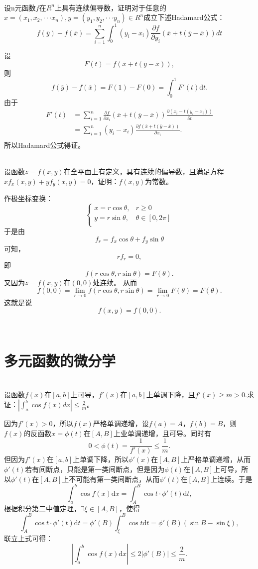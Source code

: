 	\begin{exercise}
	\hfill\\
  设n元函数$f$在$R^n$上具有连续偏导数，证明对于任意的$x=(x_1,x_2,\cdot\cdot\cdot x_n),y=(y_1,y_2,\cdot\cdot\cdot y_n)\in R^n$成立下述Hadamard公式：
  $$\displaystyle f(\bar{y})-f(\bar{x})=\sum_{i=1}^n\int_0^1(y_i-x_i)\frac{\partial f}{\partial y_i}(\bar{x}+t(\bar{y}-\bar{x}))dt$$
	
设$$F(t)=f(\overline{x}+t(\overline{y}-\overline{x})),$$
则$$f(\overline{y})-f(\overline{x})=F(1)-F(0)=\int_0^1F'(t)\mathrm{d}t.$$
由于
\begin{align*}
F'(t)&=\sum_{i=1}^n\frac{\partial f}{\partial x_i}(\overline{x}+t(\overline{y}-\overline{x}))\frac{\partial(x_i-t(y_i-x_i))}{\partial t}\\
&=\sum_{i=1}^n(y_i-x_i)\frac{\partial f(\overline{x}+t(\overline{y}-\overline{x}))}{\partial x_i}.\\
\end{align*}
所以Hadamard公式得证。
	\end{exercise}
	\begin{exercise}
	\hfill\\
	  设函数$z=f(x,y)$在全平面上有定义，具有连续的偏导数，且满足方程$xf_x(x,y)+yf_y(x,y)=0$，证明：$f(x,y)$为常数。
	
	作极坐标变换：
	$$
	\begin{cases}
	x=r\cos\theta,&r\geq0\\
	y=r\sin\theta,&\theta\in[0,2\pi]\\
	\end{cases}	
	$$
	于是由$$f_r=f_x\cos\theta+f_y\sin\theta$$可知，$$rf_r=0,$$
	即$$f(r\cos\theta,r\sin\theta)=F(\theta).$$
	又因为$z=f(x,y)$在$(0,0)$处连续。
	从而$$f(0,0)=\lim_{r\rightarrow0}f(r\cos\theta,r\sin\theta)=\lim_{r\rightarrow0}F(\theta)=F(\theta).$$
	这就是说$$f(x,y)=f(0,0).$$
	\end{exercise}
	\hfill\\
  \section{多元函数的微分学}
  \begin{exercise}
  \hfill\\
    设函数$f(x)$在$[a,b]$上可导，$f'(x)$在$[a,b]$上单调下降，且$f'(x)\geq m>0.$求证：$|\int_a^b\cos f(x)dx|\leq\frac 2m$。

因为$f'(x)>0$，所以$f(x)$严格单调递增，设$f(a)=A$，$f(b)=B$，则$f(x)$的反函数$x=\phi(t)$在$[A,B]$上业单调递增，且可导。同时有$$0<\phi(t)=\frac{1}{f'(x)}\leq\frac{1}{m}.$$
但因为$f'(x)$在$[a,b]$上单调下降，所以$\phi'(x)$在$[A,B]$上严格单调递增，从而$\phi'(t)$若有间断点，只能是第一类间断点，但是因为$\phi(t)$在$[A,B]$上可导，所以$\phi'(t)$在$[A,B]$上不可能有第一类间断点，从而$\phi'(t)$在$[A,B]$上连续。于是
$$\int_a^b\cos f(x)\mathrm{d}x=\int_A^B\cos t\cdot\phi'(t)\mathrm{d}t,$$
根据积分第二中值定理，$\exists\xi\in[A,B]$，使得
$$\int_A^B\cos t\cdot\phi'(t)\mathrm{d}t=\phi'(B)\int_{\xi}^B\cos t\mathrm{d}t=\phi'(B)(\sin B-\sin\xi),$$
联立上式可得：
$$|\int_a^b\cos f(x)\mathrm{d}x|\leq2|\phi'(B)|\leq\frac{2}{m}.$$
\end{exercise}
\hfill\\
